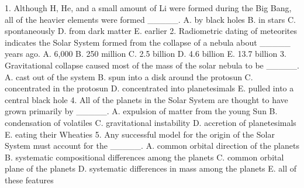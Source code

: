 






1. Although H, He, and a small amount of Li were formed during the Big Bang, all of the
heavier elements were formed _____.
A. by black holes
B. in stars
C. spontaneously
D. from dark matter
E. earlier
2. Radiometric dating of meteorites indicates the Solar System formed from the
collapse of a nebula about _____ years ago.
A. 6,000
B. 250 million
C. 2.5 billion
D. 4.6 billion
E. 13.7 billion
3. Gravitational collapse caused most of the mass of the solar nebula to be _____.
A. cast out of the system
B. spun into a disk around the protosun
C. concentrated in the protosun
D. concentrated into planetesimals
E. pulled into a central black hole
4. All of the planets in the Solar System are thought to have grown primarily by _____.
A. expulsion of matter from the young Sun
B. condensation of volatiles
C. gravitational instability
D. accretion of planetesimals
E. eating their Wheaties
5. Any successful model for the origin of the Solar System must account for the _____.
A. common orbital direction of the planets
B. systematic compositional differences among the planets
C. common orbital plane of the planets
D. systematic differences in mass among the planets
E. all of these features


